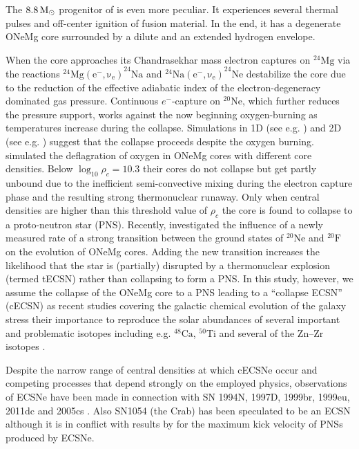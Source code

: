 \documentclass[fleqn,usenatbib]{mnras}
\newcommand{\solm}{\ensuremath{\rm{M_{\odot}}}\xspace}
\begin{document}
The $8.8\, \solm$ progenitor of \cite{Nomoto1984} is even more peculiar. 
It experiences  several thermal pulses and off-center ignition of 
fusion material. In the end, it has a degenerate ONeMg core 
surrounded by a dilute and an extended hydrogen envelope.
 
When the core approaches its Chandrasekhar mass electron captures 
on $\mathrm{^{24}Mg}$ via the reactions 
$\mathrm{^{24}Mg(e^-,\nu_e)}^{24}\mathrm{Na}$ and 
$\mathrm{^{24}Na(e^-,\nu_e)}^{24}\mathrm{Ne}$ \cite{Miyaji1980} 
destabilize the core due to the reduction of the effective 
adiabatic index of the electron-degeneracy dominated gas pressure. 
Continuous $e^-$-capture on $\mathrm{^{20}Ne}$, which further 
reduces the pressure support, works against the now beginning 
oxygen-burning as temperatures increase during the collapse. 
Simulations in 1D (see e.g. \citealt{Kitaura2006,Janka2008,
Fischer2010}) and 2D (see e.g. \citealt{Radice2017})
suggest that the collapse proceeds despite the oxygen burning. 
\cite{Jones2016} simulated the deflagration of oxygen in ONeMg 
cores with different core densities. Below $\log_{10}\rho_c=10.3$ 
their cores do not collapse but get partly unbound due to the inefficient 
semi-convective mixing during the electron capture phase and the 
resulting strong thermonuclear runaway. Only when central densities 
are higher than this threshold value of $\rho_c$ the core is 
found to collapse to a proto-neutron star (PNS).
Recently, \cite{Kirsebom2019} investigated the influence of a newly 
measured rate of a strong transition between the ground states of 
$^{20}\mathrm{Ne}$ and $^{20}\mathrm{F}$ on the evolution of ONeMg 
cores. Adding the new transition increases the likelihood that the 
star is (partially) disrupted by a thermonuclear explosion (termed tECSN) 
rather than collapsing to form a PNS. 
In this study, however, we assume the collapse of the ONeMg core to a 
PNS leading to a ``collapse ECSN'' (cECSN) as recent studies 
covering the galactic chemical evolution of the galaxy stress 
their importance to reproduce the solar abundances of several 
important and problematic isotopes including e.g. 
$\mathrm{^{48}Ca}$, $\mathrm{^{50}Ti}$ and several of the 
$\mathrm{Zn}–\mathrm{Zr}$ isotopes \cite{Jones2019}.

Despite the narrow range of central densities at which 
cECSNe occur \cite{Leung2019} and competing processes that 
depend strongly on the employed physics, observations of 
ECSNe have been made in connection with SN 1994N, 1997D, 
1999br, 1999eu, 2011dc and 2005cs \citep{Stevenson2014}. Also 
SN1054 (the Crab) has been speculated to be an ECSN although it 
is in conflict with results by \cite{Gessner2018} for the maximum 
kick velocity of PNSs produced by ECSNe.
\end{document}
